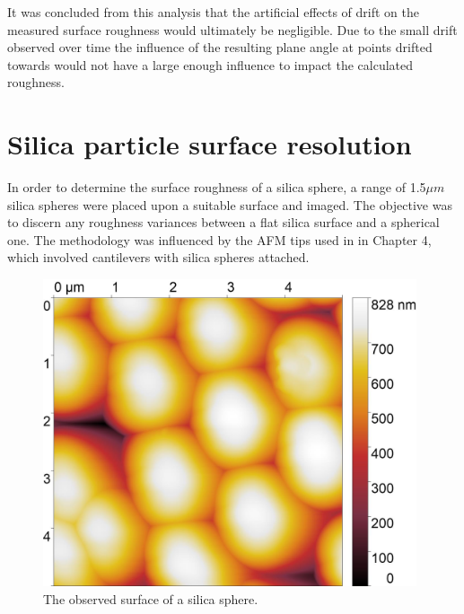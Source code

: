 It was concluded from this analysis that the artificial effects of drift on the measured surface roughness would ultimately be negligible. Due to the small drift observed over time the influence of the resulting plane angle at points drifted towards would not have a large enough influence to impact the calculated roughness.









\section{Silica particle surface resolution} %

In order to determine the surface roughness of a silica sphere, a range of 1.5$\mu m$ silica spheres were placed upon a suitable surface and imaged. The objective was to discern any roughness variances between a flat silica surface and a spherical one. The methodology was influenced by the AFM tips used in in Chapter 4, which involved cantilevers with silica spheres attached.



\begin{figure}[h]     %
        \begin{center}
          \includegraphics[width=110mm]{chapter3/5umareat2.jpg}
\end{center}
\caption{The observed surface of a silica sphere.}
\label{fig:SiliSph1}                 %
\end{figure}

